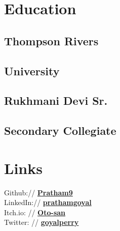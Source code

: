 \documentclass[]{pratham-resume-openfont}
\begin{document}
%
%

%
%

%
%

\begin{minipage}[t]{0.34\textwidth} 


\section{Education} 

\subsection{Thompson Rivers}
\subsection{University}
\sectionsep

\subsection{Rukhmani Devi Sr.}
\subsection{Secondary Collegiate}
\sectionsep


\section{Links} 
Github:// \href{https://https://github.com/Pratham9}{\bf Pratham9} \\
LinkedIn://  \href{https://www.linkedin.com/in/prathamgoyal}{\bf prathamgoyal} \\
Itch.io: // \href{https://oto-san.itch.io/}{\bf Oto-san} \\
Twitter: // \href{https://twitter.com/GoreKehnePerry}{\bf goyalperry}
\sectionsep


\end{minipage}
\end{document}
